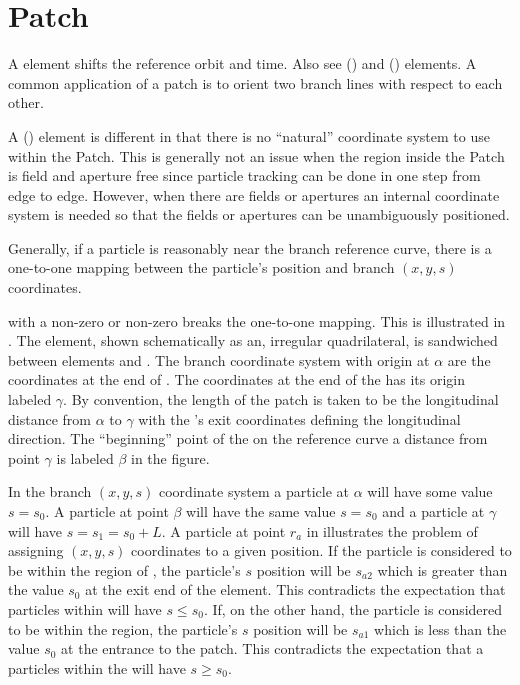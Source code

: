 \section{Patch}
\label{s:patch}

A  element shifts the reference orbit and time. Also see 
() and  () elements. A common application of a patch
is to orient two branch lines with respect to each other. 


A  () element is different in that there is no ``natural'' coordinate 
system to use within the Patch. This is generally not an issue when the region inside the
Patch is field and aperture free since particle tracking can be done in one step from edge
to edge. However, when there are fields or apertures an internal
coordinate system is needed so that the fields or apertures can be unambiguously positioned.


Generally, if a particle is reasonably near the branch reference curve, there is a one-to-one mapping
between the particle's position and branch $(x, y, s)$ coordinates. 


with a non-zero  or non-zero  breaks the one-to-one mapping. This is
illustrated in .  The  element, shown schematically as an, irregular
quadrilateral, is sandwiched between elements  and . The branch coordinate system
with origin at $\alpha$ are the coordinates at the end of . The coordinates at the end of
the  has its origin labeled $\gamma$. By convention, the length of the patch  is
taken to be the longitudinal distance from $\alpha$ to $\gamma$ with the 's exit
coordinates defining the longitudinal direction. The ``beginning'' point of the  on the
reference curve a distance  from point $\gamma$ is labeled $\beta$ in the figure.

In the branch $(x, y, s)$ coordinate system a particle at $\alpha$ will have some value $s = s_0$. A
particle at point $\beta$ will have the same value $s = s_0$ and a particle at $\gamma$ will have 
$s = s_1 = s_0 + L$. A particle at point $r_a$ in  illustrates the problem of
assigning $(x, y, s)$ coordinates to a given position. If the particle is considered to be within
the region of , the particle's $s$ position will be $s_{a2}$ which is greater than the
value $s_0$ at the exit end of the element. This contradicts the expectation that particles within
 will have $s \le s_0$.  If, on the other hand, the particle is considered to be within
the  region, the particle's $s$ position will be $s_{a1}$ which is less than the value
$s_0$ at the entrance to the patch. This contradicts the expectation that a particles within the
 will have $s \ge s_0$.

